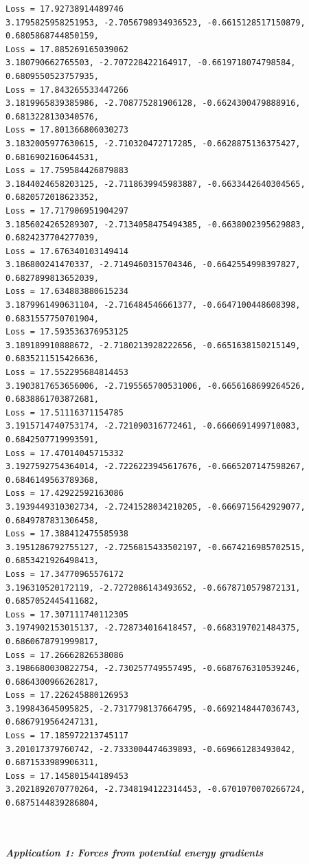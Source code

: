 \documentclass[11pt]{article}
\begin{document}
\begin{Verbatim}[commandchars=\\\{\}]
Loss = 17.92738914489746
3.1795825958251953, -2.7056798934936523, -0.6615128517150879,
0.6805868744850159,
Loss = 17.885269165039062
3.180790662765503, -2.707228422164917, -0.6619718074798584, 0.6809550523757935,
Loss = 17.843265533447266
3.1819965839385986, -2.708775281906128, -0.6624300479888916, 0.6813228130340576,
Loss = 17.801366806030273
3.1832005977630615, -2.710320472717285, -0.6628875136375427, 0.6816902160644531,
Loss = 17.759584426879883
3.1844024658203125, -2.7118639945983887, -0.6633442640304565,
0.6820572018623352,
Loss = 17.717906951904297
3.1856024265289307, -2.7134058475494385, -0.6638002395629883,
0.6824237704277039,
Loss = 17.676340103149414
3.186800241470337, -2.7149460315704346, -0.6642554998397827, 0.6827899813652039,
Loss = 17.634883880615234
3.1879961490631104, -2.716484546661377, -0.6647100448608398, 0.6831557750701904,
Loss = 17.593536376953125
3.189189910888672, -2.7180213928222656, -0.6651638150215149, 0.6835211515426636,
Loss = 17.552295684814453
3.1903817653656006, -2.7195565700531006, -0.6656168699264526,
0.6838861703872681,
Loss = 17.51116371154785
3.1915714740753174, -2.721090316772461, -0.6660691499710083, 0.6842507719993591,
Loss = 17.47014045715332
3.1927592754364014, -2.7226223945617676, -0.6665207147598267,
0.6846149563789368,
Loss = 17.42922592163086
3.1939449310302734, -2.7241528034210205, -0.6669715642929077,
0.6849787831306458,
Loss = 17.388412475585938
3.1951286792755127, -2.7256815433502197, -0.6674216985702515,
0.6853421926498413,
Loss = 17.34770965576172
3.196310520172119, -2.7272086143493652, -0.6678710579872131, 0.6857052445411682,
Loss = 17.307111740112305
3.1974902153015137, -2.728734016418457, -0.6683197021484375, 0.6860678791999817,
Loss = 17.26662826538086
3.1986680030822754, -2.730257749557495, -0.6687676310539246, 0.6864300966262817,
Loss = 17.226245880126953
3.199843645095825, -2.7317798137664795, -0.6692148447036743, 0.6867919564247131,
Loss = 17.185972213745117
3.201017379760742, -2.7333004474639893, -0.669661283493042, 0.6871533989906311,
Loss = 17.145801544189453
3.2021892070770264, -2.7348194122314453, -0.6701070070266724,
0.6875144839286804,
    \end{Verbatim}

    \begin{center}
    \end{center}
    { \hspace*{\fill} \\}
    
    \hypertarget{application-1-forces-from-potential-energy-gradients}{%
\subparagraph{Application 1: Forces from potential energy
gradients}\label{application-1-forces-from-potential-energy-gradients}}
\end{document}
